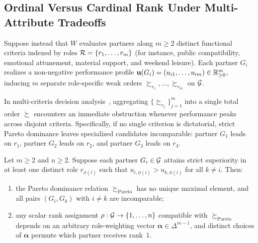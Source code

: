 \subsection{Ordinal Versus Cardinal Rank Under Multi-Attribute Tradeoffs}
\label{subsec:bg-cardinal}

\noindent\layermath{} Suppose instead that $W$ evaluates partners along $m \ge 2$ distinct functional
criteria indexed by roles $\mathcal{R} = \{r_1, \dots, r_m\}$ (for instance, public
compatibility, emotional attunement, material support, and weekend leisure).
Each partner $G_i$ realizes a non-negative performance profile
$\mathbf{u}(G_i) = (u_{i1}, \dots, u_{im}) \in \mathbb{R}_{\ge 0}^m$, inducing $m$
separate role-specific weak orders $\succsim_{r_1}, \dots, \succsim_{r_m}$ on
$\mathcal{G}$.

In multi-criteria decision analysis~\citep{keeney1976decisions,arrow1963social},
aggregating $\{\succsim_{r_j}\}_{j=1}^m$ into a single total order $\succsim$
encounters an immediate obstruction whenever performance peaks across disjoint criteria.
Specifically, if no single criterion is dictatorial, strict Pareto dominance leaves
specialized candidates incomparable: partner $G_1$ leads on $r_1$, partner $G_2$
leads on $r_2$, and partner $G_3$ leads on $r_3$.

\begin{proposition}
\label{prop:order-failure}
Let $m \ge 2$ and $n \ge 2$. Suppose each partner $G_i \in \mathcal{G}$ attains
strict superiority in at least one distinct role $r_{\phi(i)}$ such that
$u_{i,\phi(i)} > u_{k,\phi(i)}$ for all $k \neq i$. Then:
\begin{enumerate}[nosep]
  \item the Pareto dominance relation $\succsim_{\mathrm{Pareto}}$ has no
        unique maximal element, and all pairs $(G_i, G_k)$ with $i \neq k$ are
        incomparable;
  \item any scalar rank assignment $\rho : \mathcal{G} \to \{1, \dots, n\}$
        compatible with $\succsim_{\mathrm{Pareto}}$ depends on an arbitrary
        role-weighting vector $\boldsymbol{\alpha} \in \Delta^{m-1}$, and
        distinct choices of $\boldsymbol{\alpha}$ permute which partner receives
        rank~$1$.
\end{enumerate}
\end{proposition}

